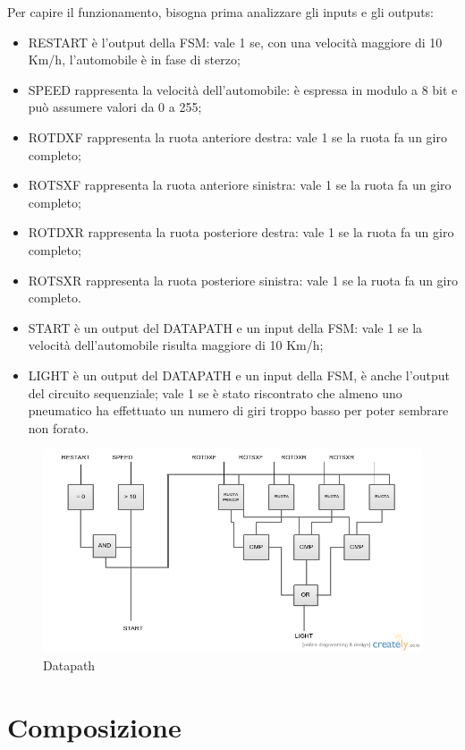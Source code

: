 \documentclass[a4paper,titlepage]{book}
\begin{document}
Per capire il funzionamento, bisogna prima analizzare gli inputs e gli outputs:
\begin{itemize}

\item RESTART è l'output della FSM: vale 1 se, con una velocità maggiore di 10 Km/h, l'automobile è in fase di sterzo;
\item SPEED rappresenta la velocità dell'automobile: è espressa in modulo a 8 bit e può assumere valori da 0 a 255;
\item ROTDXF rappresenta la ruota anteriore destra: vale 1 se la ruota fa un giro completo;
\item ROTSXF rappresenta la ruota anteriore sinistra: vale 1 se la ruota fa un giro completo;
\item ROTDXR rappresenta la ruota posteriore destra: vale 1 se la ruota fa un giro completo;
\item ROTSXR rappresenta la ruota posteriore sinistra: vale 1 se la ruota fa un giro completo.
\item START è un output del DATAPATH e un input della FSM: vale 1 se la velocità dell'automobile risulta maggiore di 10 Km/h;
\item LIGHT è un output del DATAPATH e un input della FSM, è anche l'output del circuito sequenziale; vale 1 se è stato riscontrato che almeno uno pneumatico ha effettuato un numero di giri troppo basso per poter sembrare non forato.
\end{itemize}

\begin{figure}[!hb]
\centering
\includegraphics[scale=0.45]{schemi/datapath.png}
\caption{Datapath}
\end{figure}


\section{Composizione}
\end{document}
